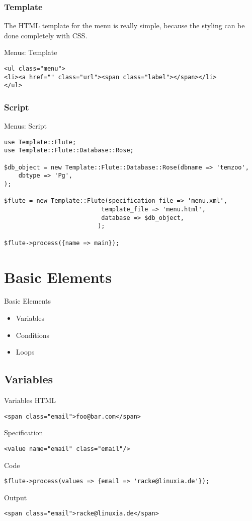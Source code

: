 \subsubsection{Template}
The HTML template for the menu is really simple, because the
styling can be done completely with CSS.

\begin{frame}[fragile]{Menus: Template}
\begin{lstlisting}
<ul class="menu">
<li><a href="" class="url"><span class="label"></span></li>
</ul>
\end{lstlisting}
\end{frame}

\subsubsection{Script}
\begin{frame}[fragile]{Menus: Script}
\begin{lstlisting}
use Template::Flute;
use Template::Flute::Database::Rose;

$db_object = new Template::Flute::Database::Rose(dbname => 'temzoo',
    dbtype => 'Pg',
);

$flute = new Template::Flute(specification_file => 'menu.xml',
						   template_file => 'menu.html',
						   database => $db_object,
						  );

$flute->process({name => main});
\end{lstlisting}
\end{frame}

\section{Basic Elements}
\begin{frame}{Basic Elements}
\begin{itemize}
\item Variables
\item Conditions
\item Loops
\end{itemize}
\end{frame}

\subsection{Variables}
\begin{frame}[fragile]{Variables}
HTML
\begin{lstlisting}
<span class="email">foo@bar.com</span>
\end{lstlisting}
Specification
\begin{lstlisting}
<value name="email" class="email"/>
\end{lstlisting}
Code
\begin{lstlisting}
$flute->process(values => {email => 'racke@linuxia.de'});
\end{lstlisting}
Output
\begin{lstlisting}
<span class="email">racke@linuxia.de</span>
\end{lstlisting}
\end{frame}

